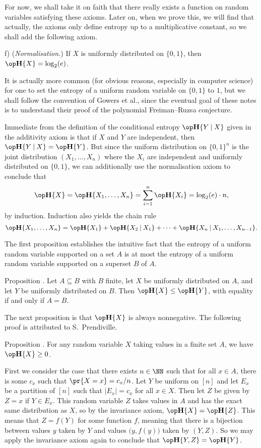 For now, we shall take it on faith that there really exists a function on random variables satisfying
these axioms. Later on, when we prove this, we will find that actually, the axioms only define entropy
up to a multiplicative constant, so we shall add the following axiom.

\medskip
\item{f)} ({\it Normalisation.}) If $X$ is uniformly distributed on $\{0,1\}$, then
$\Eta\{X\} = \log_2(e)$.
\medskip

It is actually more common (for obvious reasons, especially in computer science)
for one to set the entropy of a uniform random variable on $\{0,1\}$
to $1$, but we shall
follow the convention of Gowers et al., since the eventual goal of these notes is to understand their proof
of the polynomial Freiman--Ruzsa conjecture.

Immediate from the definition of the conditional entropy $\Eta\{Y\given X\}$ given
in the additivity axiom is that if
$X$ and $Y$ are independent, then $\Eta\{Y\given X\} = \Eta\{Y\}$. But since the uniform distribution
on $\{0,1\}^n$ is the joint distribution $(X_1,\ldots,X_n)$ where the $X_i$ are independent and
uniformly distributed on $\{0,1\}$, we can additionally use the normalisation axiom to conclude that
$$\Eta\{X\} = \Eta\{X_1,\ldots,X_n\} = \sum_{i=1}^n \Eta\{X_i\} = \log_2(e)\cdot n,$$
by induction. Induction also yields the chain rule
$$\Eta\{X_1,\ldots,X_n\} = \Eta\{X_1\} + \Eta\{X_2\given X_1\} + \cdots+\Eta\{X_n \given X_1,\ldots,X_{n-1}\}.$$

The first proposition establishes the intuitive fact
that the entropy of a uniform random variable supported on a set $A$ is at most
the entropy of a uniform random variable supported on a superset $B$ of $A$.

\proclaim Proposition \advthm. Let $A\subseteq B$ with $B$ finite,
let $X$ be uniformly distributed on $A$, and let $Y$ be uniformly distributed on $B$.
Then $\Eta\{X\} \le \Eta\{Y\}$, with equality if and only if $A = B$.

\proof

The next proposition is that $\Eta\{X\}$ is always nonnegative. The following
proof is attributed to S.~Prendiville.

\proclaim Proposition \advthm. For any random variable $X$ taking values in a finite set $A$,
we have $\Eta\{X\} \ge 0$.

\proof First we consider the case that there exists $n\in \NN$ such that for all $x\in A$, there is some
$c_x$ such that $\pr\{X = x\} = c_x/n$. Let $Y$ be uniform on $[n]$ and let $E_x$ be a partition
of $[n]$ such that $|E_x| = c_x$ for all $x\in X$. Then let $Z$ be given by $Z = x$ if $Y\in E_x$.
This random variable $Z$ takes values in $A$ and has the exact same distribution as $X$, so
by the invariance axiom, $\Eta\{X\} = \Eta\{Z\}$.
This means that $Z = f(Y)$ for some function $f$, meaning that there is a bijection between
values $y$ taken by $Y$ and values $\bigl(y, f(y)\bigr)$ taken by $(Y,Z)$. So we may apply the invariance
axiom again to conclude that $\Eta\{Y,Z\} = \Eta\{Y\}$.

